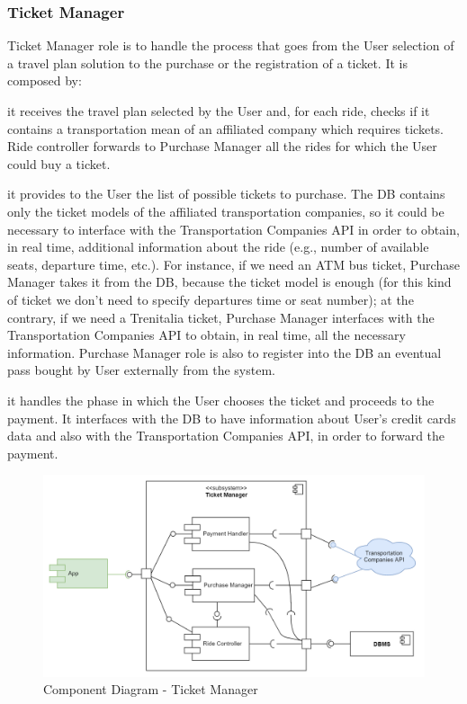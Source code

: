 	\filbreak
	\subsubsection{Ticket Manager}
		\label{sect:TicketManager}
		Ticket Manager role is to handle the process that goes from the User selection of a travel plan solution to the purchase or the registration of a ticket.\newline
		It is composed by:
		\begin{description}[before={\renewcommand{\makelabel}[1]{-- \textit{##1}:}}]
			\item[Ride Controller] it receives the travel plan selected by the User and, for each ride, checks if it contains a transportation mean of an affiliated company which requires tickets. Ride controller forwards to Purchase Manager all the rides for which the User could buy a ticket.
			\item[Purchase Manager] it provides to the User the list of possible tickets to purchase. The DB contains only the ticket models of the affiliated transportation companies, so it could be necessary to interface with the Transportation Companies API in order to obtain, in real time, additional information about the ride (e.g., number of available seats, departure time, etc.). For instance, if we need an ATM bus ticket, Purchase Manager takes it from the DB, because the ticket model is enough (for this kind of ticket we don't need to specify departures time or seat number); at the contrary, if we need a Trenitalia ticket, Purchase Manager interfaces with the Transportation Companies API to obtain, in real time, all the necessary information. \newline
			Purchase Manager role is also to register into the DB an eventual pass bought by User externally from the system.
			\item[Payment Handler] it handles the phase in which the User chooses the ticket and proceeds to the payment. It interfaces with the DB to have information about User's credit cards data and also with the Transportation Companies API, in order to forward the payment.  
		\end{description}

		\begin{figure}[H]
			\centerline{\includegraphics[width=0.9\paperwidth]{Images/CD_TicketManager}}
			\caption{Component Diagram - Ticket Manager}
		\end{figure}

